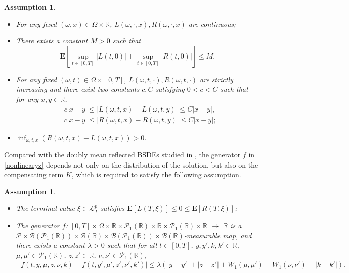 \documentclass[10pt]{article}%
\numberwithin{equation}{section}
\newtheorem{assumption}[theorem]{Assumption}
\begin{document}
\begin{assumption}\label{assLR}
\begin{itemize}
\item[(1)] For any fixed $(\omega,x)\in \Omega\times\mathbb{R}$, $L(\omega, \cdot, x), R(\omega, \cdot, x)$ are continuous;%
\item[(2)]  There exists a constant $M>0$ such that $$\mathbf{E}\left[\sup_{t\in[0,T]}\left|L(t,0)\right|+\sup_{t\in[0,T]}\left|R(t,0)\right|\right]\leq M.$$
\item[(3)] For any fixed $(\omega,t)\in \Omega\times [0,T]$, $L(\omega,t,\cdot),R(\omega,t,\cdot)$ are strictly increasing and there  exist two constants $c,C$ satisfying $0<c<C$ such that for any $x,y\in \mathbb{R}$,
\begin{align*}
&c\left|x-y\right|\leq \left|L(\omega,t,x)-L(\omega,t,y)\right|\leq C\left|x-y\right|,\\
&c\left|x-y\right|\leq \left|R(\omega,t,x)-R(\omega,t,y)\right|\leq C\left|x-y\right|;
\end{align*}
\item[(4)] $\inf_{\omega,t,x} \left(R(\omega,t,x)-L(\omega,t,x)\right)>0$.
\end{itemize}
\end{assumption}
Compared with the doubly mean reflected BSDEs studied in \cite{L}, the generator $f$ in \eqref{nonlinearyz} depends not only on the distribution of the solution, but also on the compensating term $K$, which is required to satisfy the following assumption.
\begin{assumption}\label{ass1ipterminalp}
\begin{itemize}
      \item[(i)]  The terminal value $\xi \in \mathcal{L}^{p}_T $ satisfies $\mathbf{E}[L(T,\xi)]\leq 0 \leq \mathbf{E}[R(T,\xi)]$; 
      \item[(ii)] The generator $f$: $[0,T]\times\Omega\times \mathbb{R}\times \mathcal{P}_1(\mathbb{R})\times\mathbb{R}\times \mathcal{P}_1(\mathbb{R})\times \mathbb{R}$ $\rightarrow$ $\mathbb{R}$ is a $\mathcal{P}\times\mathcal{B}(\mathcal{P}_1(\mathbb{R}))\times\mathcal{B}(\mathbb{R})\times\mathcal{B}(\mathcal{P}_1(\mathbb{R}))\times\mathcal{B}(\mathbb{R})$-measurable map, and there exists a constant $\lambda>0$ such that for all $t\in[0,T]$, $y, y', k, k' \in \mathbb{R}$, $\mu, \mu' \in \mathcal{P}_1(\mathbb{R})$, $z, z'\in \mathbb{R}$, $\nu, \nu'\in\mathcal{P}_1(\mathbb{R})$, 
\begin{align*}
\left|f(t,y,\mu,z,\nu,k)-f(t,y',\mu',z',\nu',k')\right|\leq \lambda\left(\left|y-y'\right|+\left|z-z'\right|+W_1(\mu,\mu')+W_1(\nu,\nu')+\left|k-k'\right|\right).
\end{align*}
   \end{itemize}
\end{assumption}
\end{document}

